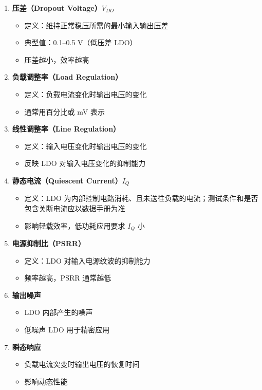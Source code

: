 \begin{enumerate}
  \item \textbf{压差（Dropout Voltage）$V_{DO}$}
    \begin{itemize}
      \item 定义：维持正常稳压所需的最小输入输出压差
      \item 典型值：0.1--0.5 V（低压差 LDO）
      \item 压差越小，效率越高
    \end{itemize}

  \item \textbf{负载调整率（Load Regulation）}
    \begin{itemize}
      \item 定义：负载电流变化时输出电压的变化
      \item 通常用百分比或 mV 表示
    \end{itemize}

  \item \textbf{线性调整率（Line Regulation）}
    \begin{itemize}
      \item 定义：输入电压变化时输出电压的变化
      \item 反映 LDO 对输入电压变化的抑制能力
    \end{itemize}

  \item \textbf{静态电流（Quiescent Current）$I_Q$}
    \begin{itemize}
      \item 定义：LDO 为内部控制电路消耗、且未送往负载的电流；测试条件和是否包含关断电流应以数据手册为准
      \item 影响轻载效率，低功耗应用要求 $I_Q$ 小
    \end{itemize}

  \item \textbf{电源抑制比（PSRR）}
    \begin{itemize}
      \item 定义：LDO 对输入电源纹波的抑制能力
      \item 频率越高，PSRR 通常越低
    \end{itemize}

  \item \textbf{输出噪声}
    \begin{itemize}
      \item LDO 内部产生的噪声
      \item 低噪声 LDO 用于精密应用
    \end{itemize}

  \item \textbf{瞬态响应}
    \begin{itemize}
      \item 负载电流突变时输出电压的恢复时间
      \item 影响动态性能
    \end{itemize}
\end{enumerate}

